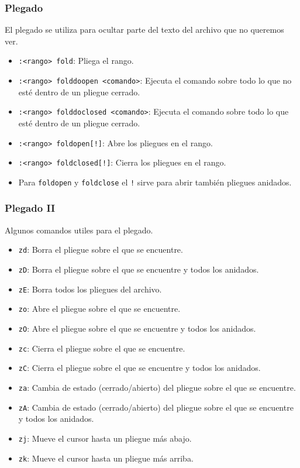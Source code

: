 \documentclass[10pt]{beamer}
\begin{document}
  \begin{frame}[containsverbatim]
    \frametitle{Plegado}
    El plegado se utiliza para ocultar parte del texto del archivo que no queremos ver. 
    \begin{itemize}
      \item \verb+:<rango> fold+: Pliega el rango.
      \item \verb+:<rango> folddoopen <comando>+: Ejecuta el comando sobre todo lo que no esté dentro de un pliegue cerrado.
      \item \verb+:<rango> folddoclosed <comando>+: Ejecuta el comando sobre todo lo que esté dentro de un pliegue cerrado.
      \item \verb+:<rango> foldopen[!]+: Abre los pliegues en el rango.
      \item \verb+:<rango> foldclosed[!]+: Cierra los pliegues en el rango.
      \item Para \verb+foldopen+ y \verb+foldclose+ el \verb+!+ sirve para abrir también pliegues anidados.
    \end{itemize}
  \end{frame}
  
  \begin{frame}[containsverbatim]
    \frametitle{Plegado II}
    Algunos comandos utiles para el plegado.
    \begin{itemize}
      \item \verb+zd+: Borra el pliegue sobre el que se encuentre.
      \item \verb+zD+: Borra el pliegue sobre el que se encuentre y todos los anidados.
      \item \verb+zE+: Borra todos los pliegues del archivo.
      \item \verb+zo+: Abre el pliegue sobre el que se encuentre.
      \item \verb+zO+: Abre el pliegue sobre el que se encuentre y todos los anidados.
      \item \verb+zc+: Cierra el pliegue sobre el que se encuentre.
      \item \verb+zC+: Cierra el pliegue sobre el que se encuentre y todos los anidados.
      \item \verb+za+: Cambia de estado (cerrado/abierto) del pliegue sobre el que se encuentre.
      \item \verb+zA+: Cambia de estado (cerrado/abierto) del pliegue sobre el que se encuentre y todos los anidados.
      \item \verb+zj+: Mueve el cursor hasta un pliegue más abajo.
      \item \verb+zk+: Mueve el cursor hasta un pliegue más arriba.
    \end{itemize}
  \end{frame}
  
\end{document}
